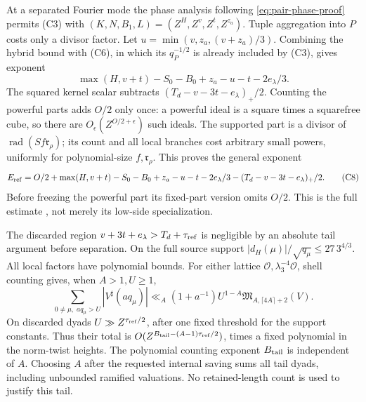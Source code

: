 \documentclass[12pt]{article}
\begin{document}
At a separated Fourier mode the phase analysis following
\eqref{eq:pair-phase-proof} permits (C3) with
\((K,N,B_1,L)=(Z^H,Z^v,Z^t,Z^{z_a})\).
Tuple aggregation into \(P\) costs only a divisor factor.
Let \(u=\min(v,z_a,(v+z_a)/3)\).
Combining the hybrid bound with (C6), in which its
\(q_P^{-1/2}\) is already included by (C3), gives exponent
\[
 \max(H,v+t)-S_0-B_0+z_a-u-t-2e_\lambda/3.
\]
The squared kernel scalar subtracts
\((T_d-v-3t-e_\lambda)_+/2\).
Counting the powerful parts adds \(O/2\) only once:
a powerful ideal is a square times a squarefree cube, so there
are \(O_\epsilon(Z^{O/2+\epsilon})\) such ideals.
The supported part is a divisor of
\(\operatorname{rad}(Sf\mathfrak r_\rho)\); its count and all
local branches cost arbitrary small powers, uniformly for
polynomial-size \(f,\mathfrak r_\rho\).
This proves the general exponent
\[
 E_{\rm ref}=O/2+\max(H,v+t)-S_0-B_0+z_a-u-t-2e_\lambda/3
                 -(T_d-v-3t-e_\lambda)_+/2.
 \tag{C8}\label{eq:full-energy-proved}
\]
Before freezing the powerful part its fixed-part version omits
\(O/2\).  This is the full estimate \cite[Lemma 14.3]{QRH},
not merely its low-side specialization.

The discarded region \(v+3t+e_\lambda>T_d+\tau_{\rm ref}\)
is negligible by an absolute tail argument before separation.
On the full source support
\(|d_H(\mu)|/\sqrt{q_\mu}\le27\,3^{4/3}\).
All local factors have polynomial bounds.
For either lattice \(\mathcal O,\lambda_3^{-4}\mathcal O\),
shell counting gives, when \(A>1,U\ge1\),
\[
 \sum_{0\ne\mu,\;a q_\mu>U}|V^\sharp(aq_\mu)|
 \ll_A (1+a^{-1})U^{1-A}
                     {\mathfrak M}_{A,\lceil4A\rceil+2}(V).
\]
On discarded dyads \(U\gg Z^{\tau_{\rm ref}/2}\), after
one fixed threshold for the support constants.
Thus their total is
\(O(Z^{B_{\rm tail}-(A-1)\tau_{\rm ref}/2})\),
times a fixed polynomial in the norm-twist heights.
The polynomial counting exponent \(B_{\rm tail}\) is independent
of \(A\).  Choosing \(A\) after the requested internal saving
sums all tail dyads, including unbounded ramified valuations.
No retained-length count is used to justify this tail.
\end{document}
